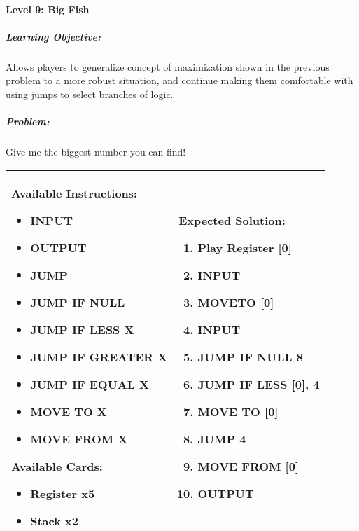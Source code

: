 \paragraph{Level 9: Big Fish}
\subparagraph{Learning Objective:} Allows players to generalize concept of maximization shown in the previous problem to a more robust situation, and continue making them comfortable with using jumps to select branches of logic.

\subparagraph{Problem:} Give me the biggest number you can find!

\begin{center}
    \begin{tabular}{ | m{5cm} | m{9cm} | } 
        \hline
            \textbf{Available Instructions:} 
            \begin{itemize}
                \setlength\itemsep{-.35em}
                \item INPUT
                \item OUTPUT
                \item JUMP
                \item JUMP IF NULL
                \item JUMP IF LESS X
                \item JUMP IF GREATER X
		\item JUMP IF EQUAL X
                \item MOVE TO X
                \item MOVE FROM X
            \end{itemize}
            \textbf{Available Cards:} 
            \begin{itemize}
                \setlength\itemsep{-.35em}
                \item Register x5
                \item Stack x2
            \end{itemize}& 
            \textbf{Expected Solution:} 
            \begin{enumerate}
                \setlength\itemsep{-.35em}
                \item Play Register [0]
                \item INPUT
                \item MOVETO [0]
                \item INPUT
                \item JUMP IF NULL 8
                \item JUMP IF LESS [0], 4
                \item MOVE TO [0]
                \item JUMP 4
                \item MOVE FROM [0]
                \item OUTPUT
            \end{enumerate}
            \\
        \hline
    \end{tabular}
\end{center}



